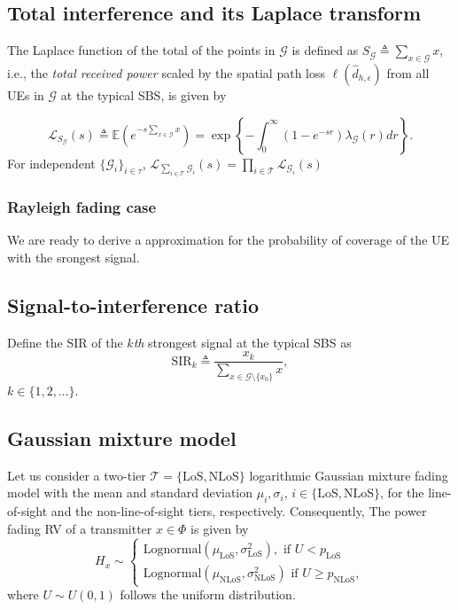 \documentclass[lettersize,journal]{IEEEtran}
\begin{document}
\subsection{Total interference and its Laplace transform}

The Laplace function of the total of the points in $\mathcal{G}$ is defined as $S_{\mathcal{G}} \triangleq \sum_{x \in \mathcal{G}}x$, i.e., the \textit{total received power} scaled by the spatial path loss $\ell(\hat{d}_{h,\epsilon})$ from all UEs in $\mathcal{G}$ at the typical SBS, is given by

\begin{equation}
  \label{eq:lapdef}
  \mathcal{L}_{S_{\mathcal{G}}}(s)\triangleq \mathbb{E}\left(e^{-s\sum\limits_{x \in \mathcal{G}}x}\right)= \exp\left\{-\int_0^{\infty}(1-e^{-sr}) \lambda_{\mathcal{G}}(r) dr \right\}.
\end{equation}
For independent $\{\mathcal{G}_i\}_{i \in \mathcal{\tau}}$, $\mathcal{L}_{\sum_{i \in \mathcal{T}} \mathcal{G}_i}(s) = \prod_{i \in \mathcal{T}} \mathcal{L}_{\mathcal{G}_i}(s)$


\subsubsection{Rayleigh fading case}

We are ready to derive a approximation for the probability of coverage of the UE with the srongest signal.

\subsection{Signal-to-interference ratio}
Define the SIR of the $k$\textit{th} strongest signal at the typical SBS as
\begin{equation}
  \text{SIR}_k \triangleq \frac{x_k}{\sum\limits_{x \in \mathcal{G} \setminus \{x_0\}}x},
\end{equation}
$k\in\{1,2,\dots\}$.


\subsection{Gaussian mixture model}
Let us consider a two-tier $\mathcal{T} = \{\text{LoS},\text{NLoS}\}$ logarithmic Gaussian mixture fading model with the mean and standard deviation $\mu_{i},\sigma_{i}$, $i \in \{\text{LoS},\text{NLoS} \}$, for the line-of-sight and the non-line-of-sight tiers, respectively. Consequently, The power fading RV of a transmitter $x \in \Phi$ is given by
\begin{equation}
  H_x \sim
  \begin{cases}
    \text{Lognormal}(\mu_{\text{LoS}},\sigma_{\text{LoS}}^2), \text{ if } U<p_{\text{LoS}} \\
    \text{Lognormal}(\mu_{\text{NLoS}},\sigma_{\text{NLoS}}^2)\text{ if } U \geq p_{\text{NLoS}},              \label{eq:tier2lognormal}
  \end{cases}
\end{equation}
where $U \sim U(0,1)$ follows the uniform distribution.
\end{document}
